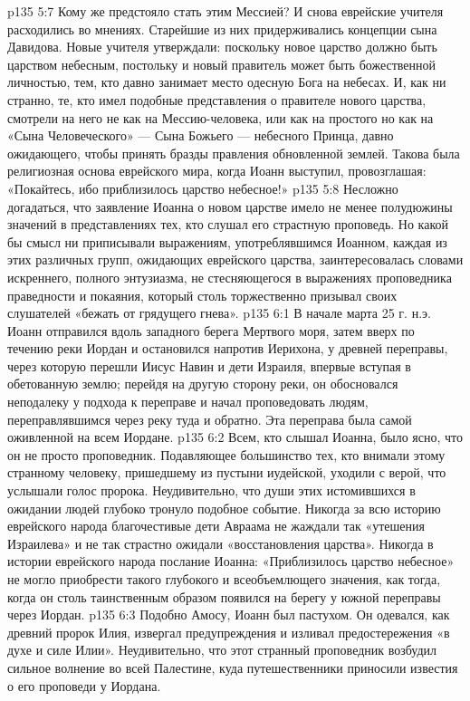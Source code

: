 \vs p135 5:7 Кому же предстояло стать этим Мессией? И снова еврейские учителя расходились во мнениях. Старейшие из них придерживались концепции сына Давидова. Новые учителя утверждали: поскольку новое царство должно быть царством небесным, постольку и новый правитель может быть божественной личностью, тем, кто давно занимает место одесную Бога на небесах. И, как ни странно, те, кто имел подобные представления о правителе нового царства, смотрели на него не как на Мессию\hyp{}человека, или как на простого  но как на «Сына Человеческого» --- Сына Божьего --- небесного Принца, давно ожидающего, чтобы принять бразды правления обновленной землей. Такова была религиозная основа еврейского мира, когда Иоанн выступил, провозглашая: «Покайтесь, ибо приблизилось царство небесное!»
\vs p135 5:8 Несложно догадаться, что заявление Иоанна о новом царстве имело не менее полудюжины значений в представлениях тех, кто слушал его страстную проповедь. Но какой бы смысл ни приписывали выражениям, употреблявшимся Иоанном, каждая из этих различных групп, ожидающих еврейского царства, заинтересовалась словами искреннего, полного энтузиазма, не стесняющегося в выражениях проповедника праведности и покаяния, который столь торжественно призывал своих слушателей «бежать от грядущего гнева».
\vs p135 6:1 В начале марта 25 г. н.э. Иоанн отправился вдоль западного берега Мертвого моря, затем вверх по течению реки Иордан и остановился напротив Иерихона, у древней переправы, через которую перешли Иисус Навин и дети Израиля, впервые вступая в обетованную землю; перейдя на другую сторону реки, он обосновался неподалеку у подхода к переправе и начал проповедовать людям, переправлявшимся через реку туда и обратно. Эта переправа была самой оживленной на всем Иордане.
\vs p135 6:2 Всем, кто слышал Иоанна, было ясно, что он не просто проповедник. Подавляющее большинство тех, кто внимали этому странному человеку, пришедшему из пустыни иудейской, уходили с верой, что услышали голос пророка. Неудивительно, что души этих истомившихся в ожидании людей глубоко тронуло подобное событие. Никогда за всю историю еврейского народа благочестивые дети Авраама не жаждали так «утешения Израилева» и не так страстно ожидали «восстановления царства». Никогда в истории еврейского народа послание Иоанна: «Приблизилось царство небесное» не могло приобрести такого глубокого и всеобъемлющего значения, как тогда, когда он столь таинственным образом появился на берегу у южной переправы через Иордан.
\vs p135 6:3 Подобно Амосу, Иоанн был пастухом. Он одевался, как древний пророк Илия, извергал предупреждения и изливал предостережения «в духе и силе Илии». Неудивительно, что этот странный проповедник возбудил сильное волнение во всей Палестине, куда путешественники приносили известия о его проповеди у Иордана.
